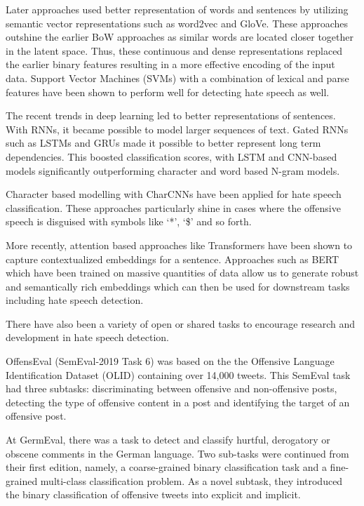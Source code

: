 \documentclass[
]{ceurart}
\begin{document}
Later approaches used better representation of words and sentences by utilizing semantic vector representations such as word2vec\cite{mikolov2013distributed} and GloVe\cite{pennington2014glove}. These approaches outshine the earlier BoW approaches as similar words are located closer together in the latent space. Thus, these continuous and dense representations replaced the earlier binary features resulting in a more effective encoding of the input data. Support Vector Machines (SVMs) with a combination of lexical and parse features have been shown to perform well for detecting hate speech as well.\cite{chen2012detecting}

The recent trends in deep learning led to better representations of sentences. With RNNs, it became possible to model larger sequences of text. Gated RNNs such as LSTMs\cite{sutskever2014sequence} and GRUs\cite{chung2014empirical} made it possible to better represent long term dependencies. This boosted classification scores, with LSTM and CNN-based models significantly outperforming character and word based N-gram models.\cite{badjatiya2017dlhate}

Character based modelling with CharCNNs\cite{zhang2015character} have been applied for hate speech classification. These approaches particularly shine in cases where the offensive speech is disguised with symbols like `*', `\$' and so forth.\cite{character-abuse}

More recently, attention based approaches like Transformers\cite{vaswani2017attention} have been shown to capture contextualized embeddings for a sentence. Approaches such as BERT\cite{devlin2018bert} which have been trained on massive quantities of data allow us to generate robust and semantically rich embeddings which can then be used for downstream tasks including hate speech detection. 


There have also been a variety of open or shared tasks to encourage research and development in hate speech detection. 

OffensEval (SemEval-2019 Task 6)\cite{zampieri-etal-2019-semeval} was based on the the Offensive Language Identification Dataset (OLID) containing over 14,000 tweets. This SemEval task had three subtasks: discriminating between offensive and non-offensive posts, detecting the type of offensive content in a post and identifying the target of an offensive post.

At GermEval,\cite{germeval-task-2} there was a task to detect and classify hurtful, derogatory or obscene comments in the German language. Two sub-tasks were continued from their first edition, namely, a coarse-grained binary classification task and a fine-grained multi-class classification problem. As a novel subtask, they introduced the binary classification of offensive tweets into explicit and implicit.
\end{document}
